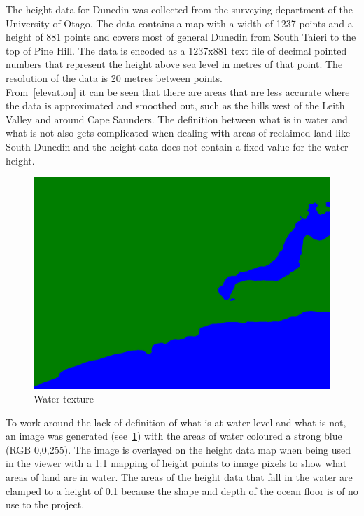 \documentclass[12pt]{report}
\begin{document}
The height data for Dunedin was collected from the surveying department of the University of Otago. The data contains a map with a width of 1237 points and a height of 881 points and covers most of general Dunedin from South Taieri to the top of Pine Hill. The data is encoded as a 1237x881 text file of decimal pointed numbers that represent the height above sea level in metres of that point. The resolution of the data is 20 metres between points.\\

From~\ref{elevation} it can be seen that there are areas that are less accurate where the data is approximated and smoothed out, such as the hills west of the Leith Valley and around Cape Saunders. The definition between what is in water and what is not also gets complicated when dealing with areas of reclaimed land like South Dunedin and the height data does not contain a fixed value for the water height.\\

\begin{figure}
\includegraphics[scale=0.25]{terrain.png}
\caption{Water texture}
\label{overlaytexture}
\end{figure}
To work around the lack of definition of what is at water level and what is not, an image was generated (see~\ref{overlaytexture}) with the areas of water coloured a strong blue (RGB 0,0,255). The image is overlayed on the height data map when being used in the viewer with a 1:1 mapping of height points to image pixels to show what areas of land are in water. The areas of the height data that fall in the water are clamped to a height of 0.1 because the shape and depth of the ocean floor is of no use to the project.\\
\end{document}

